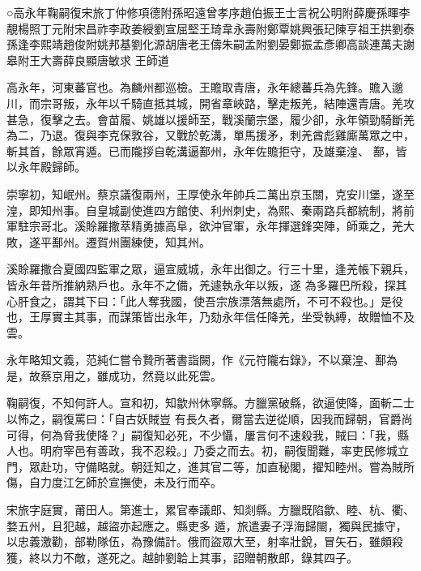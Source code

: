 
\begin{pinyinscope}

 ○高永年鞠嗣復宋旅丁仲修項德附孫昭遠曾孝序趙伯振王士言祝公明附薛慶孫暉李靚楊照丁元附宋昌祚李政姜綬劉宣屈堅王琦韋永壽附鄭覃姚興張玘陳亨祖王拱劉泰孫逢李熙靖趙俊附姚邦基劉化源胡唐老王儔朱嗣孟附劉晏鄭振孟彥卿高談連萬夫謝皋附王大壽薛良顯唐敏求
 王師道



 高永年，河東蕃官也。為麟州都巡檢。王贍取青唐，永年總蕃兵為先鋒。贍入邈川，而宗哥叛，永年以千騎直抵其城，開省章峽路，擊走叛羌，結陣還青唐。羌攻甚急，復擊之去。會苗履、姚雄以援師至，戰溪蘭宗堡，履少卻，永年領勁騎斷羌為二，乃退。復與李克保敦谷，又戰於乾溝，單馬援矛，刺羌酋彪雞廝萬眾之中，斬其首，餘眾宵遁。已而隴拶自乾溝逼鄯州，永年佐贍拒守，及雄棄湟、
 鄯，皆以永年殿歸師。



 崇寧初，知岷州。蔡京議復兩州，王厚使永年帥兵二萬出京玉關，克安川堡，遂至湟，即知州事。自皇城副使進四方館使、利州刺史，為熙、秦兩路兵都統制，將前軍駐宗哥北。溪賒羅撒萃精勇據高阜，欲沖官軍，永年揮選鋒突陣，師乘之，羌大敗，遂平鄯州。遷賀州團練使，知其州。



 溪賒羅撒合夏國四監軍之眾，逼宣威城，永年出御之。行三十里，逢羌帳下親兵，皆永年昔所推納熟戶也。永年不之備，羌遽執永年以叛，遂
 為多羅巴所殺，探其心肝食之，謂其下曰：「此人奪我國，使吾宗族漂落無處所，不可不殺也。」是役也，王厚實主其事，而謀策皆出永年，乃劾永年信任降羌，坐受執縛，故贈恤不及雲。



 永年略知文義，范純仁嘗令贄所著書詣闕，作《元符隴右錄》，不以棄湟、鄯為是，故蔡京用之，雖成功，然竟以此死雲。



 鞠嗣復，不知何許人。宣和初，知歙州休寧縣。方臘黨破縣，欲逼使降，面斬二士以怖之，嗣復罵曰：「自古妖賊豈
 有長久者，爾當去逆從順，因我而歸朝，官爵尚可得，何為脅我使降？」嗣復知必死，不少懾，屢言何不速殺我，賊曰：「我，縣人也。明府宰邑有善政，我不忍殺。」乃委之而去。初，嗣復聞難，率吏民修城立門，眾赴功，守備略就。朝廷知之，進其官二等，加直秘閣，擢知睦州。嘗為賊所傷，自力度江乞師於宣撫使，未及行而卒。



 宋旅字庭實，莆田人。第進士，累官奉議郎、知剡縣。方臘既陷歙、睦、杭、衢、婺五州，且犯越，越盜亦起應之。縣吏多
 遁，旅遣妻子浮海歸閩，獨與民據守，以忠義激勸，部勒隊伍，為豫備計。俄而盜眾大至，射率壯銳，冒矢石，雖頗殺獲，終以力不敵，遂死之。越帥劉韐上其事，詔贈朝散郎，錄其四子。




\end{pinyinscope}
